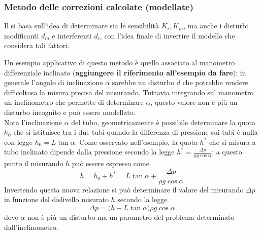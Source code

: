 	\subsubsection{Metodo delle correzioni calcolate (modellate)}
		Il  si basa sull'idea di determinare sia le sensibilità $K_i, K_m$, ma anche i disturbi modificanti $d_m$ e interferenti $d_i$, con l'idea finale di invertire il modello che considera tali fattori.
		
		Un esempio applicativo di questo metodo è quello associato al manometro differenziale inclinato (\textbf{aggiungere il riferimento all'esempio da fare}); in generale l'angolo di inclinazione $\alpha$ sarebbe un disturbo $d$ che potrebbe rendere difficoltosa la misura precisa del misurando. Tuttavia integrando sul manometro un inclinometro che permette di determinare $\alpha$, questo valore non è più un disturbo incognito e può essere modellato. \\ 
		Nota l'inclinazione $\alpha$ del tubo, geometricamente è possibile determinare la quota $h_0$ che si istituisce tra i due tubi quando la differenza di pressione sui tubi è nulla con legge $h_0 = L\tan\alpha$. Come osservato nell'esempio, la quota $h^*$ che si misura a tubo inclinato dipende dalla pressione secondo la legge $h^* = \frac{\Delta p}{\rho g \cos\alpha}$; a questo punto il misurando $h$ può essere espresso come
		\[ h = h_0 + h^* = L\tan\alpha + \frac{\Delta p}{\rho g \cos\alpha} \]
		Invertendo questa nuova relazione si può determinare il valore del misurando $\Delta p$ in funzione del dislivello misurato $h$ secondo la legge
		\[ \Delta p = \big(h-L\tan\alpha\big) \rho g \cos\alpha \]
		dove $\alpha$ non è più un disturbo ma un parametro del problema determinato dall'inclinometro.